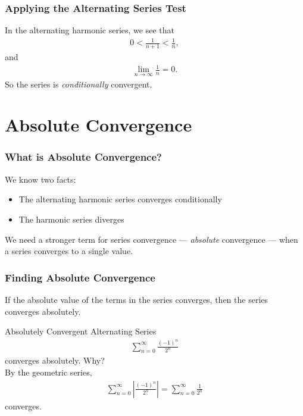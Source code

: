 \documentclass{beamer}
\begin{document}
\begin{frame}
  \frametitle{Applying the Alternating Series Test}
   In the alternating harmonic series, we see that\pause
      \begin{align*}
        0 < \frac{1}{n+1} < \frac{1}{n},
      \end{align*}\pause
      and
      \begin{align*}
        \lim_{n\rightarrow\infty}\frac{1}{n} = 0.
      \end{align*} \pause
      So the series is \textit{conditionally} convergent.
\end{frame}
\section{Absolute Convergence}
\begin{frame}
  \frametitle{What is Absolute Convergence?}
  We know two facts: \pause
  \begin{itemize}
    \item<1-> The alternating harmonic series converges conditionally
    \item<2-> The harmonic series diverges
  \end{itemize}\pause
  We need a stronger term for series convergence --- \textit{absolute} convergence --- when a series converges to a single value.
\end{frame}
\begin{frame}
  \frametitle{Finding Absolute Convergence}
  If the absolute value of the terms in the series converges, then the series converges absolutely.\pause\\
  \begin{exampleblock}{Absolutely Convergent Alternating Series}
    \begin{align*}
      \sum_{n=0}^{\infty}\frac{(-1)^{n}}{2^n}
    \end{align*}
    converges absolutely. Why?\pause\\

    By the geometric series,
    \begin{align*}
      \sum_{n=0}^{\infty}\left|\frac{(-1)^{n}}{2^n}\right| = \sum_{n=0}^{\infty}\frac{1}{2^n}
    \end{align*}
    converges.
  \end{exampleblock}
\end{frame}
\end{document}
